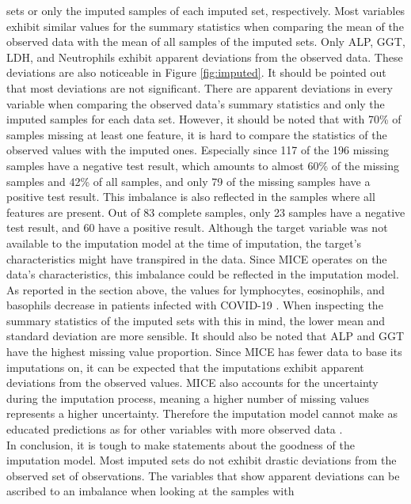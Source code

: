 sets or only the imputed samples of each imputed set, respectively.  Most 
variables exhibit similar values for the summary statistics when comparing the 
mean of the observed data with the mean of all samples of the imputed sets. Only 
ALP, GGT, LDH, and Neutrophils exhibit apparent deviations from the observed 
data. These deviations are also noticeable in Figure \ref{fig:imputed}. It 
should be pointed out that most deviations are not significant. There are 
apparent deviations in every variable when comparing the observed data's summary 
statistics and only the imputed samples for each data set. However, it should be 
noted that with 70\% of samples missing at least one feature, it is hard to 
compare the statistics of the observed values with the imputed ones. Especially 
since 117 of the 196 missing samples have a negative test result, which amounts 
to almost 60\% of the missing samples and 42\% of all samples, and only 79 of 
the missing samples have a positive test result. This imbalance is also 
reflected in the samples where all features are present. Out of 83 complete 
samples, only 23 samples have a negative test result, and 60 have a positive 
result. Although the target variable was not available to the imputation model 
at the time of imputation, the target's characteristics might have transpired in 
the data. Since MICE operates on the data's characteristics, this imbalance 
could be reflected in the imputation model. As reported in the section above, 
the values for lymphocytes, eosinophils, and basophils decrease in patients 
infected with COVID-19 \cite{RN162, RN181}. When inspecting the summary 
statistics of the imputed sets with this in mind, the lower mean and standard 
deviation are more sensible. It should also be noted that ALP and GGT have the 
highest missing value proportion. Since MICE has fewer data to base its 
imputations on, it can be expected that the imputations exhibit apparent 
deviations from the observed values. MICE also accounts for the uncertainty 
during the imputation process, meaning a higher number of missing values 
represents a higher uncertainty. Therefore the imputation model cannot make as 
educated predictions as for other variables with more observed data \cite{RN141, 
RN142}.
\\
In conclusion, it is tough to make statements about the goodness of the 
imputation model. Most imputed sets do not exhibit drastic deviations from the 
observed set of observations. The variables that show apparent 
deviations can be ascribed to an imbalance when looking at the samples with 
